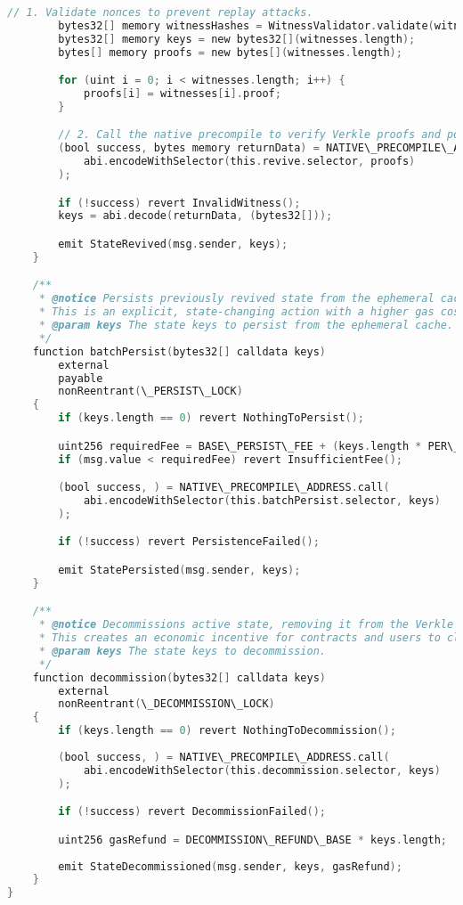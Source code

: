 \documentclass{article}
\begin{document}
\begin{lstlisting}[language=C,caption={RevivalPrecompileV2.sol - Main Contract Interface},label={lst:main}]
        // 1. Validate nonces to prevent replay attacks.
        bytes32[] memory witnessHashes = WitnessValidator.validate(witnesses);
        bytes32[] memory keys = new bytes32[](witnesses.length);
        bytes[] memory proofs = new bytes[](witnesses.length);

        for (uint i = 0; i < witnesses.length; i++) {
            proofs[i] = witnesses[i].proof;
        }

        // 2. Call the native precompile to verify Verkle proofs and populate the ephemeral cache.
        (bool success, bytes memory returnData) = NATIVE\_PRECOMPILE\_ADDRESS.call(
            abi.encodeWithSelector(this.revive.selector, proofs)
        );

        if (!success) revert InvalidWitness();
        keys = abi.decode(returnData, (bytes32[]));

        emit StateRevived(msg.sender, keys);
    }

    /**
     * @notice Persists previously revived state from the ephemeral cache to the global Verkle tree.
     * This is an explicit, state-changing action with a higher gas cost.
     * @param keys The state keys to persist from the ephemeral cache.
     */
    function batchPersist(bytes32[] calldata keys)
        external
        payable
        nonReentrant(\_PERSIST\_LOCK)
    {
        if (keys.length == 0) revert NothingToPersist();

        uint256 requiredFee = BASE\_PERSIST\_FEE + (keys.length * PER\_KEY\_PERSIST\_FEE);
        if (msg.value < requiredFee) revert InsufficientFee();

        (bool success, ) = NATIVE\_PRECOMPILE\_ADDRESS.call(
            abi.encodeWithSelector(this.batchPersist.selector, keys)
        );

        if (!success) revert PersistenceFailed();

        emit StatePersisted(msg.sender, keys);
    }

    /**
     * @notice Decommissions active state, removing it from the Verkle tree and providing a gas refund.
     * This creates an economic incentive for contracts and users to clean up obsolete state.
     * @param keys The state keys to decommission.
     */
    function decommission(bytes32[] calldata keys)
        external
        nonReentrant(\_DECOMMISSION\_LOCK)
    {
        if (keys.length == 0) revert NothingToDecommission();
        
        (bool success, ) = NATIVE\_PRECOMPILE\_ADDRESS.call(
            abi.encodeWithSelector(this.decommission.selector, keys)
        );

        if (!success) revert DecommissionFailed();

        uint256 gasRefund = DECOMMISSION\_REFUND\_BASE * keys.length;
        
        emit StateDecommissioned(msg.sender, keys, gasRefund);
    }
}
\end{lstlisting}
\end{document}
